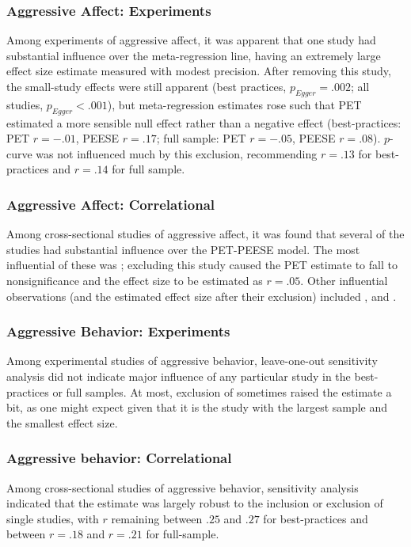 \documentclass[man]{apa6}
\begin{document}
\subsubsection{Aggressive Affect: Experiments} Among experiments of aggressive affect, it was apparent that one study \citep{Ballard:Weist:1996} had substantial influence over the meta-regression line, having an extremely large effect size estimate measured with modest precision. After removing this study, the small-study effects were still apparent (best practices, $p_{Egger} = .002$; all studies, $p_{Egger} < .001$), but meta-regression estimates rose such that PET estimated a more sensible null effect rather than a negative effect (best-practices: PET $r = -.01$, PEESE $r = .17$; full sample: PET $r = -.05$, PEESE $r = .08$). $p$-curve was not influenced much by this exclusion, recommending $r = .13$ for best-practices and $r = .14$ for full sample. 

\subsubsection{Aggressive Affect: Correlational} Among cross-sectional studies of aggressive affect, it was found that several of the studies had substantial influence over the PET-PEESE model. The most influential of these was \citet{Uozumi:2006}; excluding this study caused the PET estimate to fall to nonsignificance and the effect size to be estimated as $r = .05$. Other influential observations (and the estimated effect size after their exclusion) included \citet[study 2, $r = .13$]{Matsuzaki:etal:2004}, and \citet[$r = .16$]{Yukawa:Sakamoto:2001}.

\subsubsection{Aggressive Behavior: Experiments}Among experimental studies of aggressive behavior, leave-one-out sensitivity analysis did not indicate major influence of any particular study in the best-practices or full samples. At most, exclusion of \citet{Anderson:etal:2007} sometimes raised the estimate a bit, as one might expect given that it is the study with the largest sample and the smallest effect size.

\subsubsection{Aggressive behavior: Correlational} Among cross-sectional studies of aggressive behavior, sensitivity analysis indicated that the estimate was largely robust to the inclusion or exclusion of single studies, with $r$ remaining between $.25$ and $.27$ for best-practices and between $r = .18$ and $r = .21$ for full-sample.
\end{document}
